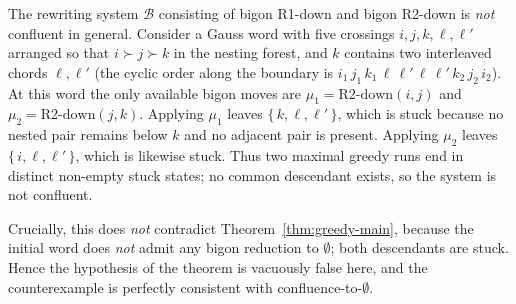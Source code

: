 
\begin{remark}\label{rem:non-confluent}
The rewriting system $\mathcal{B}$ consisting of bigon R1-down and
bigon R2-down is \emph{not} confluent in general.  Consider a Gauss
word with five crossings $i,j,k,\ell,\ell'$ arranged so that
$i \succ j \succ k$ in the nesting forest, and $k$ contains two
interleaved chords $\ell,\ell'$ (the cyclic order along the boundary
is $i_{1}\,j_{1}\,k_{1}\,\ell\,\ell'\,\ell\,\ell'\,k_{2}\,j_{2}\,i_{2}$).
At this word the only available bigon moves are
$\mu_{1}=\text{R2-down}(i,j)$ and $\mu_{2}=\text{R2-down}(j,k)$.
Applying $\mu_{1}$ leaves $\{\,k,\ell,\ell'\,\}$, which is stuck
because no nested pair remains below $k$ and no adjacent pair is
present.  Applying $\mu_{2}$ leaves $\{\,i,\ell,\ell'\,\}$, which is
likewise stuck.  Thus two maximal greedy runs end in distinct
non-empty stuck states; no common descendant exists, so the system is
not confluent.

Crucially, this does \emph{not} contradict
Theorem~\ref{thm:greedy-main}, because the initial word does \emph{not}
admit any bigon reduction to $\emptyset$; both descendants are stuck.
Hence the hypothesis of the theorem is vacuously false here, and the
counterexample is perfectly consistent with
confluence-to-$\emptyset$.
\end{remark}
